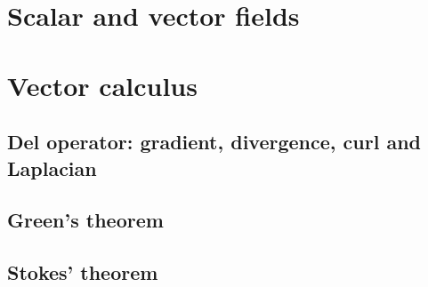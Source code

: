 \section{Scalar and vector fields}

\section{Vector calculus}

\subsection{Del operator: gradient, divergence, curl and Laplacian}

\subsection{Green's theorem}

\subsection{Stokes' theorem}



%
%
